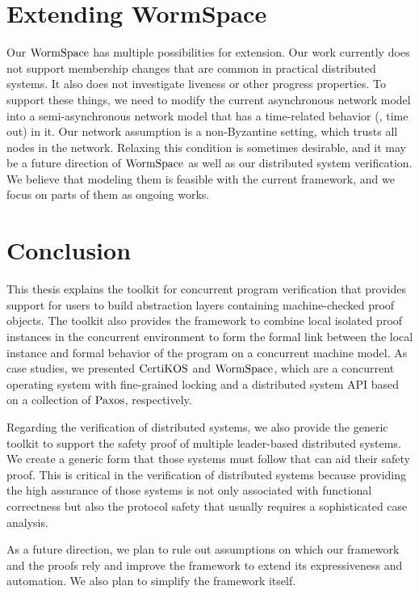 \section{Extending WormSpace}

Our $\mathrm{WormSpace}$ has multiple possibilities for extension. Our work currently does not support membership changes 
that are common in practical distributed systems. It also does not investigate liveness or other progress properties. 
To support these things, we need to modify the current asynchronous network model into a semi-asynchronous 
network model that has a time-related behavior (\ie, time out) in it. 
Our network assumption is a non-Byzantine setting, which trusts all nodes in the network. Relaxing this condition is sometimes desirable,
 and it may be a future direction of  $\mathrm{WormSpace}$ as well as our distributed system verification. 
 We believe that modeling them is feasible with the current framework, and we focus on parts of them as ongoing works.
 
 
\section{Conclusion}

This thesis explains the toolkit for concurrent program verification that provides support for users to build abstraction layers containing 
machine-checked proof objects. The toolkit also provides the framework to combine local isolated proof instances in the concurrent environment 
to form the  formal link between the local instance and formal behavior of the program on a concurrent machine model. 
As case studies, we presented $\mathrm{CertiKOS}$ and $\mathrm{WormSpace}$, 
which are a concurrent operating system with fine-grained locking and a distributed system API based on a collection of $\mathrm{Paxos}$, respectively.

Regarding the verification of distributed systems, we also provide the generic toolkit to support the safety proof of multiple 
leader-based distributed systems. We create a generic form that those systems must follow that can aid their safety proof. 
This is critical in the verification of distributed systems because providing the high assurance of those systems is not only associated with 
functional correctness but also the protocol safety that usually requires a sophisticated case analysis.

As a future direction, we plan to rule out assumptions on which our framework and the proofs rely and improve the framework to
extend its expressiveness and automation. We also plan to simplify the framework itself.
